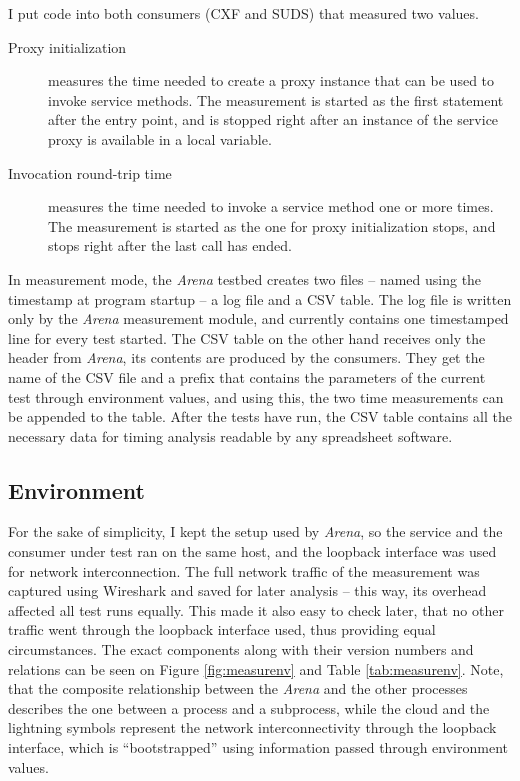 \noindent
I put code into both consumers (CXF and SUDS) that measured two values.
\begin{description}
 \item[Proxy initialization] measures the time needed to create a proxy instance that can be used to invoke service methods. The measurement is started as the first statement after the entry point, and is stopped right after an instance of the service proxy is available in a local variable.
 \item[Invocation round-trip time] measures the time needed to invoke a service method one or more times. The measurement is started as the one for proxy initialization stops, and stops right after the last call has ended.
\end{description}

\noindent
In measurement mode, the \emph{Arena} testbed creates two files -- named using the timestamp at program startup -- a log file and a CSV table. The log file is written only by the \emph{Arena} measurement module, and currently contains one timestamped line for every test started. The CSV table on the other hand receives only the header from \emph{Arena}, its contents are produced by the consumers. They get the name of the CSV file and a prefix that contains the parameters of the current test through environment values, and using this, the two time measurements can be appended to the table. After the tests have run, the CSV table contains all the necessary data for timing analysis readable by any spreadsheet software.

\subsection{Environment}

For the sake of simplicity, I kept the setup used by \emph{Arena}, so the service and the consumer under test ran on the same host, and the loopback interface was used for network interconnection. The full network traffic of the measurement was captured using Wireshark and saved for later analysis -- this way, its overhead affected all test runs equally. This made it also easy to check later, that no other traffic went through the loopback interface used, thus providing equal circumstances. The exact components along with their version numbers and relations can be seen on Figure \ref{fig:measurenv} and Table \ref{tab:measurenv}. Note, that the composite relationship between the \emph{Arena} and the other processes describes the one between a process and a subprocess, while the cloud and the lightning symbols represent the network interconnectivity through the loopback interface, which is ``bootstrapped'' using information passed through environment values.

